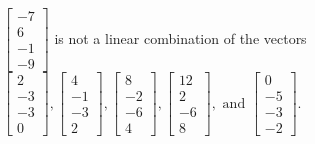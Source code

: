 \begin{exerciseAnswer}
\begin{enumerate}[(a)]
\( \left[\begin{array}{c}
-7 \\
6 \\
-1 \\
-9
\end{array}\right] \) is not a linear combination of the vectors \( \left[\begin{array}{c}
2 \\
-3 \\
-3 \\
0
\end{array}\right] , \left[\begin{array}{c}
4 \\
-1 \\
-3 \\
2
\end{array}\right] , \left[\begin{array}{c}
8 \\
-2 \\
-6 \\
4
\end{array}\right] , \left[\begin{array}{c}
12 \\
2 \\
-6 \\
8
\end{array}\right] , \text{ and } \left[\begin{array}{c}
0 \\
-5 \\
-3 \\
-2
\end{array}\right] \). 


\end{enumerate}
    
\end{exerciseAnswer}
    
